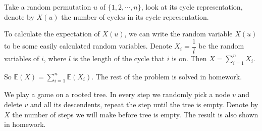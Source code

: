 \documentclass{scribe}
\theoremstyle{plain}
\theoremstyle{empty}
\begin{document}
\begin{example}
    Take a random permutation $u$ of $\{1,2,\cdots,n\}$, look at its cycle representation, denote by $X(u)$ the number of cycles in its cycle representation.
    
    To calculate the expectation of $X(u)$, we can write the random variable $X(u)$ to be some easily calculated random variables. Denote $X_i=\dfrac{1}{l}$ be the random variables of $i$, where $l$ is the length of the cycle that $i$ is on. Then $X=\sum\limits_{i=1}^nX_i$.

    So $\mathbb{E}(X)=\sum\limits_{i=1}^n\mathbb{E}(X_i)$. The rest of the problem is solved in homework.
\end{example}

\begin{example}
    We play a game on a rooted tree. In every step we randomly pick a node $v$ and delete $v$ and all its descendents, repeat the step until the tree is empty. Denote by $X$ the number of steps we will make before tree is empty. The result is also shown in homework.
\end{example}
\end{document}
